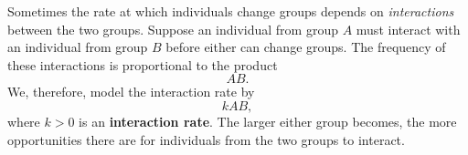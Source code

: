 \documentclass[09pt,letterpaper]{article}
\begin{document}
Sometimes the rate at which individuals change groups depends on
\textit{interactions} between the two groups. Suppose an individual from group $A$ must interact with an individual from group $B$ before either can change groups. The frequency of these interactions is proportional to the product
\[
AB.
\]
We, therefore, model the interaction rate by
\[
kAB,
\]
where $k>0$ is an \textbf{interaction rate}. The larger either group becomes, the more opportunities there are for
individuals from the two groups to interact.


\end{document}
